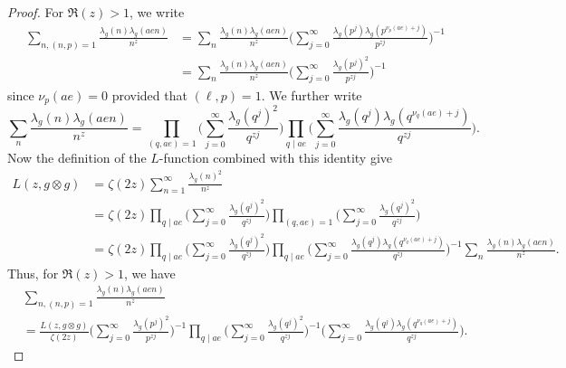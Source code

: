 \documentclass[10pt,a4paper]{amsart}
\begin{document}
\begin{proof}
For $\Re(z)>1$, we write   \begin{align*}
    \sum_{n, (n, p)=1}  \frac{\lambda_g(n)  \lambda_g(aen)}{n^{z}}
    &= \sum_{n}  \frac{\lambda_g(n)  \lambda_g(aen)}{n^{z}}
    \Big( \sum_{j=0}^\infty
    \frac{\lambda_g(p^j) \lambda_g(p^{\nu_p(ae)+j})}{p^{zj}}
    \Big)^{-1} \\&=  \sum_{n}  \frac{\lambda_g(n)  \lambda_g(aen)}{n^{z}}
    \Big( \sum_{j=0}^\infty
    \frac{\lambda_g(p^j)^2 }{p^{zj}}
    \Big)^{-1}   \end{align*}
since  $\nu_p(ae)=0$ provided that $(\ell, p)=1$. We further write    \[
     \sum_{n}  \frac{\lambda_g(n)  \lambda_g(aen)}{n^{z}}
     =\prod_{(q, ae)=1} 
     \Big( \sum_{j=0}^\infty
    \frac{\lambda_g(q^j)^2}{q^{zj}}
    \Big)
    \prod_{q\mid ae} 
     \Big( \sum_{j=0}^\infty
    \frac{\lambda_g(q^j) \lambda_g(q^{\nu_{q}(ae)+j})}{q^{zj}}
    \Big).
    \]
Now the definition of the $L$-function combined with this identity give
    \begin{align*}
    L(z, g\otimes g)
   & = \zeta(2z) \sum_{n=1}^\infty \frac{\lambda_g(n)^2}{n^z}
    \\
    &= \zeta(2z) 
    \prod_{q \mid ae} 
     \Big( \sum_{j=0}^\infty
    \frac{\lambda_g(q^j)^2}{q^{zj}}
    \Big)
    \prod_{(q, ae)=1} 
     \Big( \sum_{j=0}^\infty
    \frac{\lambda_g(q^j)^2}{q^{zj}}
    \Big)
    \\
    &= \zeta(2z) 
    \prod_{q \mid ae} 
     \Big( \sum_{j=0}^\infty
    \frac{\lambda_g(q^j)^2}{q^{zj}}
    \Big)
    \prod_{q\mid ae} 
     \Big( \sum_{j=0}^\infty
    \frac{\lambda_g(q^j) \lambda_g(q^{\nu_{q}(ae)+j})}{q^{zj}}
    \Big)^{-1}
     \sum_{n}  \frac{\lambda_g(n)  \lambda_g(aen)}{n^{z}} .
    \end{align*}
Thus, for $\Re(z) >1$, we have
    \begin{align*}
       & \sum_{n, (n, p)=1}  \frac{\lambda_g(n)  \lambda_g(aen)}{n^{z}}
       \\
        & = 
        \frac{L(z, g\otimes g)}{\zeta(2z) } \Big( \sum_{j=0}^\infty
    \frac{\lambda_g(p^j)^2}{p^{zj}}
    \Big)^{-1}
        \prod_{q\mid ae} 
         \Big( \sum_{j=0}^\infty
    \frac{\lambda_g(q^j)^2}{q^{zj}}
    \Big)^{-1}
     \Big( \sum_{j=0}^\infty
    \frac{\lambda_g(q^j) \lambda_g(q^{\nu_{q}(ae)+j})}{q^{zj}}
    \Big).
    \end{align*}
\end{proof}
\end{document}
